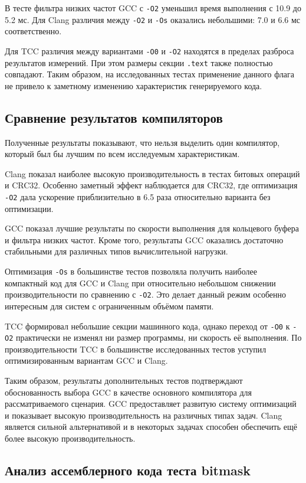 \documentclass[12pt,a4paper]{article}
\begin{document}
В тесте фильтра низких частот GCC с \texttt{-O2} уменьшил время выполнения с 10.9 до 5.2 мс. Для Clang различия между \texttt{-O2} и \texttt{-Os} оказались небольшими: 7.0 и 6.6 мс соответственно.

Для TCC различия между вариантами \texttt{-O0} и \texttt{-O2} находятся в пределах разброса результатов измерений. При этом размеры секции \texttt{.text} также полностью совпадают. Таким образом, на исследованных тестах применение данного флага не привело к заметному изменению характеристик генерируемого кода.

\subsection{Сравнение результатов компиляторов}

Полученные результаты показывают, что нельзя выделить один компилятор, который был бы лучшим по всем исследуемым характеристикам.

Clang показал наиболее высокую производительность в тестах битовых операций и CRC32. Особенно заметный эффект наблюдается для CRC32, где оптимизация \texttt{-O2} дала ускорение приблизительно в 6.5 раза относительно варианта без оптимизации.

GCC показал лучшие результаты по скорости выполнения для кольцевого буфера и фильтра низких частот. Кроме того, результаты GCC оказались достаточно стабильными для различных типов вычислительной нагрузки.

Оптимизация \texttt{-Os} в большинстве тестов позволяла получить наиболее компактный код для GCC и Clang при относительно небольшом снижении производительности по сравнению с \texttt{-O2}. Это делает данный режим особенно интересным для систем с ограниченным объёмом памяти.

TCC формировал небольшие секции машинного кода, однако переход от \texttt{-O0} к \texttt{-O2} практически не изменял ни размер программы, ни скорость её выполнения. По производительности TCC в большинстве исследованных тестов уступил оптимизированным вариантам GCC и Clang.

Таким образом, результаты дополнительных тестов подтверждают обоснованность выбора GCC в качестве основного компилятора для рассматриваемого сценария. GCC предоставляет развитую систему оптимизаций и показывает высокую производительность на различных типах задач. Clang является сильной альтернативой и в некоторых задачах способен обеспечить ещё более высокую производительность.
\subsection{Анализ ассемблерного кода теста bitmask}
\end{document}
